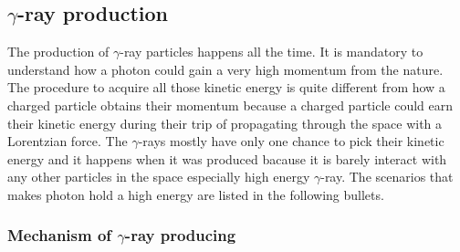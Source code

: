 \subsection{$\gamma$-ray production}

The production of $\gamma$-ray particles happens all the 
time. It is mandatory to understand how a photon could 
gain a very high momentum from the nature. The procedure 
to acquire all those kinetic energy is quite different from how
a charged particle obtains their momentum because a 
charged particle could earn their kinetic energy during 
 their trip of propagating through the space with a 
Lorentzian force. The $\gamma$-rays mostly have only one 
chance to pick their kinetic energy and it happens when it 
was produced bacause it is barely interact with any other 
particles in the space especially high energy $\gamma$-ray.
The scenarios that makes photon hold a high energy are 
listed in the following bullets.

\subsubsection{Mechanism of $\gamma$-ray producing}

